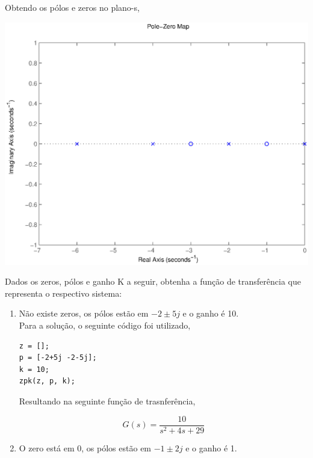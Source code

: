 \documentclass[a4paper, 10pt]{article}
\begin{document}
\begin{list}{\textbf{Questão .}}{
\setlength{\labelwidth}{-2mm} \setlength{\parsep}{0mm}
\setlength{\topsep}{0mm} \setlength{\leftmargin}{0mm}}
     Obtendo os pólos e zeros no plano-s,
        \begin{center}
                \includegraphics[scale=0.6]{fig3q.eps}
             \end{center}

     



\newpage

         \item
             Dados os zeros, pólos e ganho K a seguir, obtenha a função de transferência 
             que representa o respectivo sistema:
        \begin{enumerate}
            \item

                Não existe zeros, os pólos estão em $-2\pm5j$ e o ganho é 10.\\
                
                Para a solução, o seguinte código foi utilizado,

                \begin{lstlisting}
z = [];
p = [-2+5j -2-5j];
k = 10;
zpk(z, p, k);               
                \end{lstlisting}

                Resultando na seguinte função de trasnferência,

                $$
                G(s) = \frac{10}{s^2 + 4 s + 29}
                $$



             \item
                 O zero está em 0, os pólos estão em $-1\pm2j$ e o ganho é 1.\\


\end{enumerate}
\end{list}
\end{document}
